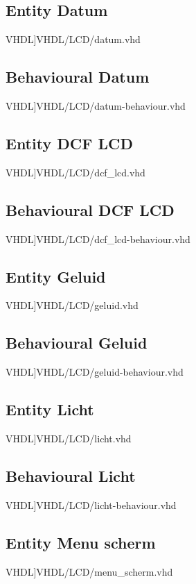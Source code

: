 \subsection{Entity Datum}
\scriptsize 
 VHDL]{VHDL/LCD/datum.vhd}
\normalsize
\label{code:beh_datum}
\subsection{Behavioural Datum}
\scriptsize 
 VHDL]{VHDL/LCD/datum-behaviour.vhd}
\normalsize
\label{code:ent_dcf-lcd}
\subsection{Entity DCF LCD}
\scriptsize 
 VHDL]{VHDL/LCD/dcf_lcd.vhd}
\normalsize
\label{code:beh_dcf-lcd}
\subsection{Behavioural DCF LCD}
\scriptsize 
 VHDL]{VHDL/LCD/dcf_lcd-behaviour.vhd}
\normalsize
\label{code:ent_geluid}
\subsection{Entity Geluid}
\scriptsize 
 VHDL]{VHDL/LCD/geluid.vhd}
\normalsize
\label{code:beh_geluid}
\subsection{Behavioural Geluid}
\scriptsize 
 VHDL]{VHDL/LCD/geluid-behaviour.vhd}
\normalsize
\label{code:ent_licht}
\subsection{Entity Licht}
\scriptsize 
 VHDL]{VHDL/LCD/licht.vhd}
\normalsize
\label{code:beh_licht}
\subsection{Behavioural Licht}
\scriptsize 
 VHDL]{VHDL/LCD/licht-behaviour.vhd}
\normalsize
\label{code:ent_menu_scherm}
\subsection{Entity Menu scherm}
\scriptsize 
 VHDL]{VHDL/LCD/menu_scherm.vhd}
\normalsize
\label{code:beh_menu_scherm}
